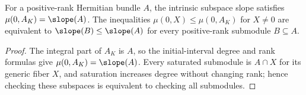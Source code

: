\begin{lemma}
\label{lem:hermitian-convex-slopes}
\leanok
For a positive-rank Hermitian bundle $A$, the intrinsic subspace slope
satisfies $\mu(0,A_K)=\slope(A)$. The inequalities
$\mu(0,X)\leq\mu(0,A_K)$ for $X\ne0$ are equivalent to
$\slope(B)\leq\slope(A)$ for every positive-rank submodule $B\subseteq A$.
\end{lemma}
\begin{proof}
The integral part of $A_K$ is $A$, so the initial-interval degree and
rank formulas give $\mu(0,A_K)=\slope(A)$.
Every saturated submodule is $A\cap X$ for its generic fiber $X$,
and saturation increases degree without changing rank; hence checking
these subspaces is equivalent to checking all submodules.
\end{proof}

